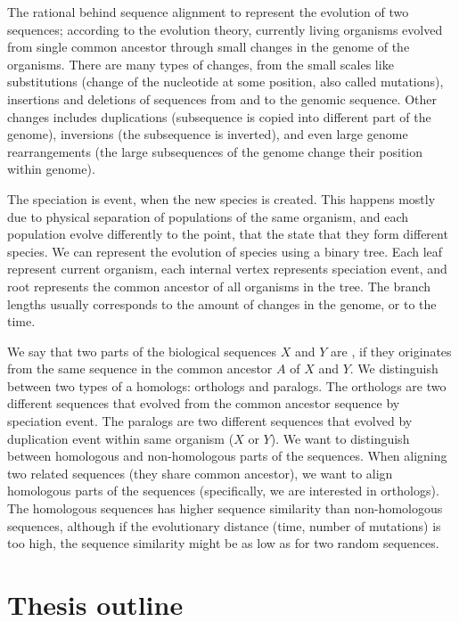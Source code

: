 The rational behind sequence alignment to represent the evolution of two
sequences; according to the evolution theory, currently living organisms
evolved from single common ancestor through small changes in the genome of the
organisms. There are many types of changes, from the small scales like
substitutions (change of the nucleotide at some position, also called
mutations), insertions and deletions of sequences from and to the genomic
sequence. Other changes includes duplications (subsequence is copied into
different part of the genome), inversions (the subsequence is inverted), and
even large genome rearrangements (the large subsequences of the genome change
their position within genome). 

The speciation is event, when the new species is created. This happens mostly
due to physical separation of populations of the same organism, and each
population evolve differently to the point, that the state that they form
different species. We can represent the evolution of species using a binary
tree. Each leaf represent current organism, each internal vertex represents
speciation event, and root represents the common ancestor of all organisms in
the tree. The branch lengths usually corresponds to the amount of changes in
the genome, or to the time. 

We say that two parts of the biological sequences $X$ and $Y$ are
, if they originates from the same sequence in the
common ancestor $A$ of $X$ and $Y$. We distinguish between two types of a
homologs: orthologs and paralogs. The orthologs are two different sequences
that evolved from the common ancestor sequence by speciation event. The
paralogs are two different sequences that evolved by duplication event within
same organism ($X$ or $Y$). We want to distinguish between homologous and
non-homologous parts of the sequences. When aligning two related sequences
(they share common ancestor), we want to align homologous parts of the
sequences (specifically, we are interested in orthologs). The homologous
sequences has higher sequence similarity than non-homologous sequences,
although if the evolutionary distance (time, number of mutations) is too high,
the sequence similarity might be as low as for two random sequences.


\section{Thesis outline}



